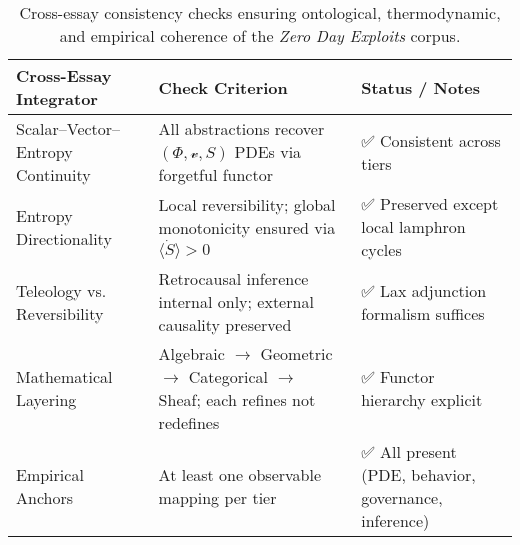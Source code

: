\begin{table}[H]
\centering
\scriptsize
\renewcommand{\arraystretch}{1.25}
\setlength{\tabcolsep}{6pt}
\begin{tabular}{@{}lll@{}}
\toprule
\textbf{Cross-Essay Integrator} & \textbf{Check Criterion} & \textbf{Status / Notes} \\
\midrule
Scalar–Vector–Entropy Continuity & All abstractions recover $(\Phi,\boldsymbol{\mathcal{v}},S)$ PDEs via forgetful functor & ✅ Consistent across tiers \\
Entropy Directionality & Local reversibility; global monotonicity ensured via $\langle \dot S\rangle > 0$ & ✅ Preserved except local lamphron cycles \\
Teleology vs. Reversibility & Retrocausal inference internal only; external causality preserved & ✅ Lax adjunction formalism suffices \\
Mathematical Layering & Algebraic $\to$ Geometric $\to$ Categorical $\to$ Sheaf; each refines not redefines & ✅ Functor hierarchy explicit \\
Empirical Anchors & At least one observable mapping per tier & ✅ All present (PDE, behavior, governance, inference) \\
\bottomrule
\end{tabular}
\caption{Cross-essay consistency checks ensuring ontological, thermodynamic, and empirical coherence of the \emph{Zero Day Exploits} corpus.}
\end{table}
